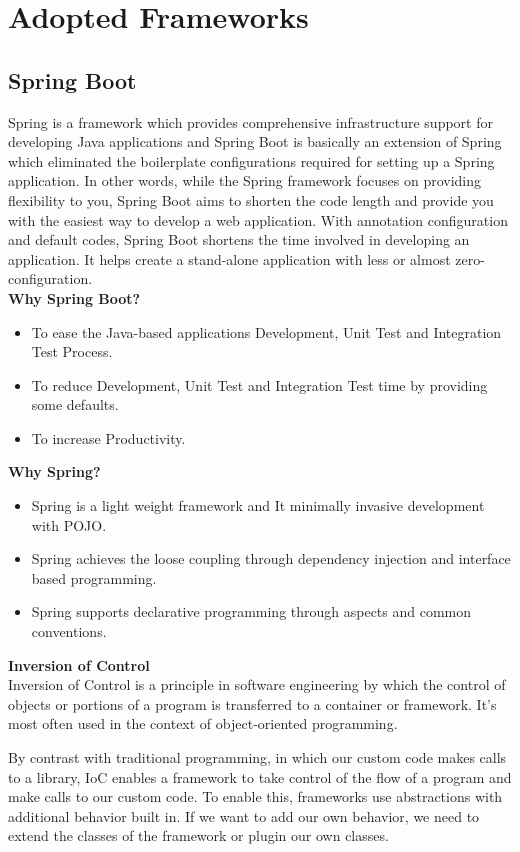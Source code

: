 \section{Adopted Frameworks}

\subsection{Spring Boot}
Spring is a framework which provides comprehensive infrastructure support for developing Java applications and Spring Boot is basically an extension of Spring which eliminated the boilerplate configurations required for setting up a Spring application.
In other words, while the Spring framework focuses on providing flexibility to you, Spring Boot aims to shorten the code length and provide you with the easiest way to develop a web application. With annotation configuration and default codes, Spring Boot shortens the time involved in developing an application. It helps create a stand-alone application with less or almost zero-configuration.\\

\textbf{Why Spring Boot?}
\begin{itemize}
\item To ease the Java-based applications Development, Unit Test and Integration Test Process.
\item To reduce Development, Unit Test and Integration Test time by providing some defaults.
\item To increase Productivity.
\end{itemize}

\textbf{Why Spring?}
\begin{itemize}
\item Spring is a light weight framework and It minimally invasive development with POJO.
\item Spring achieves the loose coupling through dependency injection and interface based programming.
\item Spring supports declarative programming through aspects and common conventions.
\end{itemize}

\textbf{Inversion of Control}\\
Inversion of Control is a principle in software engineering by which the control of objects or portions of a program is transferred to a container or framework. It’s most often used in the context of object-oriented programming.

By contrast with traditional programming, in which our custom code makes calls to a library, IoC enables a framework to take control of the flow of a program and make calls to our custom code. To enable this, frameworks use abstractions with additional behavior built in. If we want to add our own behavior, we need to extend the classes of the framework or plugin our own classes.

